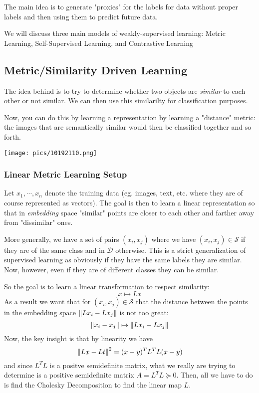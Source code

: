 \documentclass[11pt]{scrartcl}
\begin{document}
The main idea is to generate "proxies" for the labels for data without proper labels and then using them to predict future data. 

We will discuss three main models of weakly-supervised learning: Metric Learning, Self-Supervised Learning, and Contrastive Learning

\subsection{Metric/Similarity Driven Learning}
The idea behind  is to try to determine whether two objects are \textit{similar} to each other or not similar. We can then use this similarilty for classification purposes. 

Now, you can do this by learning a representation by learning a "distance" metric: the images that are semantically similar would then be classified together and so forth. 

\begin{center}
    \texttt{[image: pics/10192110.png]}
\end{center}


\subsubsection{Linear Metric Learning Setup}
Let $x_1,\cdots,x_n$ denote the training data (eg. images, text, etc. where they are of course represented as vectors). The goal is then to learn a linear representation so that in \textit{embedding} space "similar" points are closer to each other and farther away from "dissimilar" ones. 

More generally, we have a set of pairs $(x_i,x_j)$ where we have $(x_i,x_j) \in \mathcal{S}$ if they are of the same class and in $\mathcal{D}$ otherwise. This is a strict generalization of supervised learning as obviously if they have the same labels they are similar. Now, however, even if they are of different classes they can be similar. 


So the goal is to learn a linear transformation to respect similarity: 
$$x \mapsto Lx$$
As a result we want that for $(x_i,x_j) \in \mathcal{S}$ that the distance between the points in the embedding space $\left\lVert Lx_i-Lx_j\right\rVert$ is not too great:
$$\left\lVert x_i-x_j\right\rVert \mapsto \left\lVert Lx_i-Lx_j\right\rVert$$
Now, the key insight is that by linearity we have
$$\left\lVert Lx-Lt\right\rVert^2=(x-y)^{T}L^TL(x-y)$$ and since $L^TL$ is a positve semidefinite matrix, what we really are trying to determine is a positive semidefinite matrix $A=L^{T}L \succeq	0$. Then, all we have to do is find the Cholesky Decomposition to find the linear map $L$. 
\end{document}
